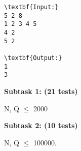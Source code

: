 \begin{verbatim}
\textbf{Input:}
5 2 8
1 2 3 4 5
4 2
5 2

\textbf{Output:}
1
3\end{verbatim}

\textbf{Subtask 1: (21 tests) }

N, Q  $\le$  2000

\textbf{Subtask 2: (10 tests) }

N, Q  $\le$  100000.